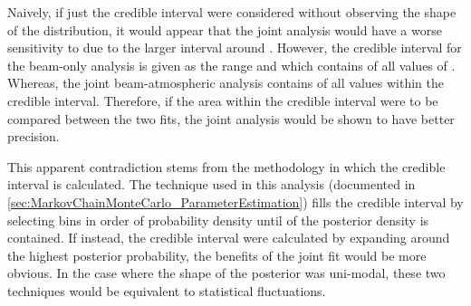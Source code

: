 Naively, if just the \quickmath{1\sigma} credible interval were considered without observing the shape of the distribution, it would appear that the joint analysis would have a worse sensitivity to  due to the larger interval around . However, the \quickmath{1\sigma} credible interval for the beam-only analysis is given as the range  and \quickmath{[2.64, \pi]} which contains  of all values of . Whereas, the joint beam-atmospheric analysis contains  of all  values within the \quickmath{1\sigma} credible interval. Therefore, if the area within the \quickmath{1\sigma} credible interval were to be compared between the two fits, the joint analysis would be shown to have better precision.

This apparent contradiction stems from the methodology in which the credible interval is calculated. The technique used in this analysis (documented in \autoref{sec:MarkovChainMonteCarlo_ParameterEstimation}) fills the credible interval by selecting bins in order of probability density until  of the posterior density is contained. If instead, the credible interval were calculated by expanding around the highest posterior probability, the benefits of the joint fit would be more obvious. In the case where the shape of the posterior was uni-modal, these two techniques would be equivalent to statistical fluctuations.

